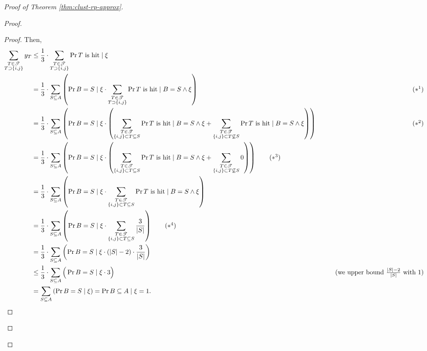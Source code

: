 \begin{proof}[Proof of Theorem \ref{thm:clust-rp-approx}]
\begin{proof}
\begin{proof}
            Then,
            \begin{align*}
                \sum_{\substack{T \in \mathscr{T}\\T \supset \{i,j\}}} y_T &\le \frac13 \cdot \sum_{\substack{T \in \mathscr{T}\\T \supset \{i,j\}}} \Pr{T \text{ is hit} \mid \xi}&\\
                &=\frac13 \cdot \sum_{S \subseteq A} \left(\Pr{B = S \mid \xi} \cdot \sum_{\substack{T \in \mathscr{T}\\T \supset \{i,j\}}} \Pr{T \text{ is hit} \mid B = S \wedge \xi}\right)&\tag{$*^1$}\\
                &=\frac13 \cdot \sum_{S \subseteq A} \left(\Pr{B = S \mid \xi} \cdot \left(\sum_{\substack{T \in \mathscr{T}\\ \{i,j\} \subset T  \subseteq S}} \Pr{T \text{ is hit} \mid B = S \wedge \xi} + \sum_{\substack{T \in \mathscr{T}\\ \{i,j\} \subset T  \not\subseteq S}} \Pr{T \text{ is hit} \mid B = S \wedge \xi}\right)\right)&\tag{$*^2$}\\
                &=\frac13 \cdot \sum_{S \subseteq A} \left(\Pr{B = S \mid \xi} \cdot \left(\sum_{\substack{T \in \mathscr{T}\\ \{i,j\} \subset T  \subseteq S}} \Pr{T \text{ is hit} \mid B = S \wedge \xi} + \sum_{\substack{T \in \mathscr{T}\\ \{i,j\} \subset T  \not\subseteq S}} 0\right)\right)\tag{$*^3$}&\\
                &=\frac13 \cdot \sum_{S \subseteq A} \left(\Pr{B = S \mid \xi} \cdot \sum_{\substack{T \in \mathscr{T}\\ \{i,j\} \subset T  \subseteq S}} \Pr{T \text{ is hit} \mid B = S \wedge \xi} \right)&\\
                &=\frac13 \cdot \sum_{S \subseteq A} \left(\Pr{B = S \mid \xi} \cdot \sum_{\substack{T \in \mathscr{T}\\ \{i,j\} \subset T  \subseteq S}}  \frac3{|S|} \right)\tag{$*^4$}&\\
                &=\frac13 \cdot \sum_{S \subseteq A} \left(\Pr{B = S \mid \xi} \cdot (|S| -2) \cdot  \frac3{|S|} \right)&\\
                &\le\frac13 \cdot \sum_{S \subseteq A} \Big(\Pr{B = S \mid \xi} \cdot 3 \Big)&\tag{we upper bound $\frac{|S|-2}{|S|}$ with 1}\\
                &=\sum_{S \subseteq A} \left(\Pr{B = S \mid \xi} \right) = \Pr{B \subseteq A\mid \xi}= 1.&
            \end{align*}
            

\end{proof}
\end{proof}
\end{proof}
